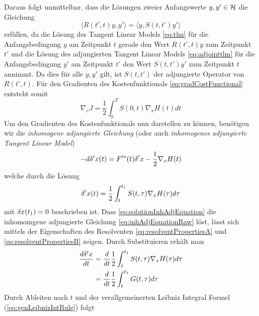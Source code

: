 Daraus folgt unmittelbar, dass die Lösungen zweier Anfangswerte $y,y' \in \mathcal{H}$ die Gleichung
\begin{equation*}
\langle R(t',t)y,y'\rangle = \langle y,S(t,t')y'\rangle 
\end{equation*}
erfüllen, da die Lösung des Tangent Linear Models \eqref{eq:tlm} für die Anfangsbedingung $y$ am Zeitpunkt $t$ gerade den Wert $R(t',t)y$ zum Zeitpunkt $t'$ und die Lösung des adjungierten Tangent Linear Models \eqref{eq:adjointtlm} für die Anfangsbedingung $y'$ am Zeitpunkt $t'$ den Wert $S(t,t')y'$ zum Zeitpunkt $t$ annimmt. Da dies für alle $y,y'$ gilt, ist $S(t,t')$ der adjungierte Operator von $R(t',t)$.
Für den Gradienten des Kostenfunktionals \eqref{eq:gradCostFunctional} entsteht somit
\begin{equation}
\label{eq:gradCostFunctionalAdjoint}
 \nabla_v J = \frac{1}{2}\int_0^T S(0,t) \nabla_x H(t) dt
\end{equation}
Um den Gradienten des Kostenfunktionals nun darstellen zu können, benötigen wir die \textit{inhomogene adjungierte Gleichung} (oder auch \textit{inhomogenes adjungierte Tangent Linear Model})
\begin{equation}
\label{eq:inhAdjEquationRaw}
-d\delta'x(t) = F'^*(t)\delta'x -\frac{1}{2} \nabla_x H(t)
\end{equation}
welche durch die Lösung 
\begin{equation}
\label{eq:solutionInhAdjEquation}
 \delta'x(t) = \frac{1}{2}\int_t^{t_1} S(t,\tau)\nabla_x H(\tau)d\tau
\end{equation}
mit $\delta x(t_1)=0$ beschrieben ist.
Dass \eqref{eq:solutionInhAdjEquation} die inhomomgene adjungierte Gleichung \eqref{eq:inhAdjEquationRaw} löst, lässt sich mittels der Eigenschaften des Resolventen \eqref{eq:resolventPropertiesA} und \eqref{eq:resolventPropertiesB} zeigen. Durch Substituieren erhält man
\begin{equation*}
 \begin{aligned}
  \frac{d\delta'x}{dt} &= \frac{d}{dt} \frac{1}{2}\int_t^{t_1} S(t,\tau)\nabla_x H(\tau)d\tau \\
			 &= \frac{d}{dt} \frac{1}{2}\int_t^{t_1} G(t,\tau)d\tau 
\end{aligned}
\end{equation*}
Durch Ableiten nach $t$ und der verallgemeinerten Leibniz Integral Formel (\ref{eq:genLeibnizIntRule}) folgt
